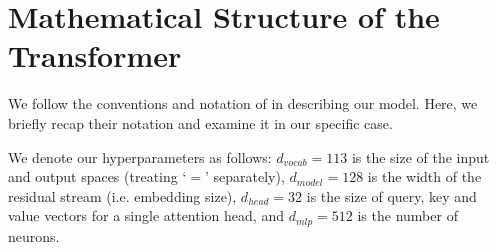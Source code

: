 \documentclass{article} %
\begin{document}






\section{Mathematical Structure of the Transformer}
\label{sec:maths}
We follow the conventions and notation of \cite{elhage2021mathematical} in describing our model. Here, we briefly recap their notation and examine it in our specific case.

We denote our hyperparameters as follows: $d_{vocab}=113$ is the size of the input and output spaces (treating `$=$' separately), $d_{model}=128$ is the width of the residual stream (i.e. embedding size), $d_{head}=32$ is the size of query, key and value vectors for a single attention head, and $d_{mlp}=512$ is the number of neurons.
\end{document}
